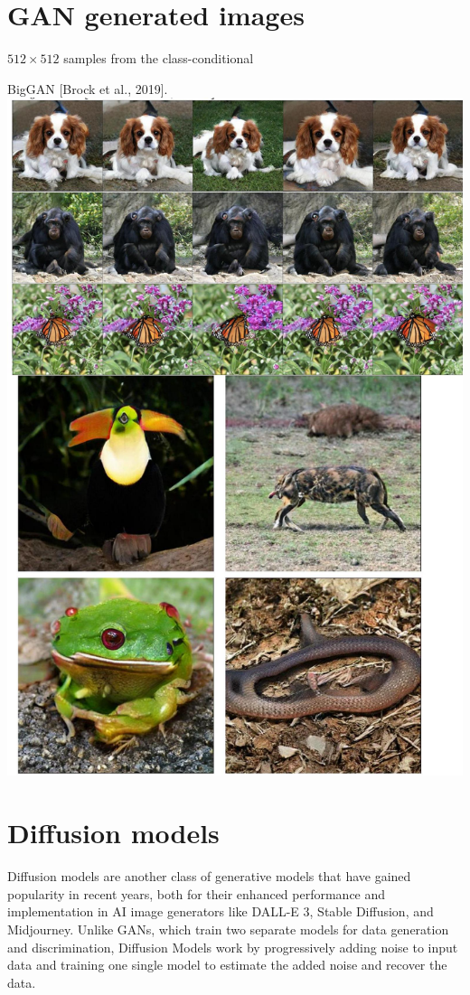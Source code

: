 \documentclass[10pt]{article}
\begin{document}
\section*{GAN generated images}
$512 \times 512$ samples from the class-conditional

BigGAN [Brock et al., 2019].
\includegraphics[max width=\textwidth, center]{2024_01_08_a381fc3992661ee7020eg-12}

\section*{Diffusion models}
Diffusion models are another class of generative models that have gained popularity in recent years, both for their enhanced performance and implementation in AI image generators like DALL-E 3, Stable Diffusion, and Midjourney. Unlike GANs, which train two separate models for data generation and discrimination, Diffusion Models work by progressively adding noise to input data and training one single model to estimate the added noise and recover the data.
\end{document}
